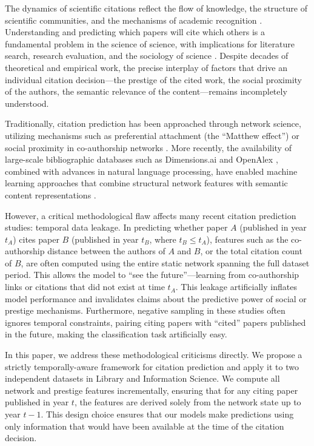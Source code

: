 \documentclass[12pt,a4paper]{article}
\begin{document}
The dynamics of scientific citations reflect the flow of knowledge, the structure of scientific communities, and the mechanisms of academic recognition \citep{wang2008measuring, fortunato2018science}. Understanding and predicting which papers will cite which others is a fundamental problem in the science of science, with implications for literature search, research evaluation, and the sociology of science \citep{zeng2017science}. Despite decades of theoretical and empirical work, the precise interplay of factors that drive an individual citation decision---the prestige of the cited work, the social proximity of the authors, the semantic relevance of the content---remains incompletely understood.

Traditionally, citation prediction has been approached through network science, utilizing mechanisms such as preferential attachment (the ``Matthew effect'') \citep{merton1968matthew, de1976general, barabasi1999emergence} or social proximity in co-authorship networks \citep{newman2004coauthorship}. More recently, the availability of large-scale bibliographic databases such as Dimensions.ai \citep{herzog2020dimensions} and OpenAlex \citep{priem2022openalex}, combined with advances in natural language processing, have enabled machine learning approaches that combine structural network features with semantic content representations \citep{chakraborty2015towards, shibata2012link}.

However, a critical methodological flaw affects many recent citation prediction studies: temporal data leakage. In predicting whether paper $A$ (published in year $t_A$) cites paper $B$ (published in year $t_B$, where $t_B \le t_A$), features such as the co-authorship distance between the authors of $A$ and $B$, or the total citation count of $B$, are often computed using the entire static network spanning the full dataset period. This allows the model to ``see the future''---learning from co-authorship links or citations that did not exist at time $t_A$. This leakage artificially inflates model performance and invalidates claims about the predictive power of social or prestige mechanisms. Furthermore, negative sampling in these studies often ignores temporal constraints, pairing citing papers with ``cited'' papers published in the future, making the classification task artificially easy.

In this paper, we address these methodological criticisms directly. We propose a strictly temporally-aware framework for citation prediction and apply it to two independent datasets in Library and Information Science. We compute all network and prestige features incrementally, ensuring that for any citing paper published in year $t$, the features are derived solely from the network state up to year $t-1$. This design choice ensures that our models make predictions using only information that would have been available at the time of the citation decision.
\end{document}
